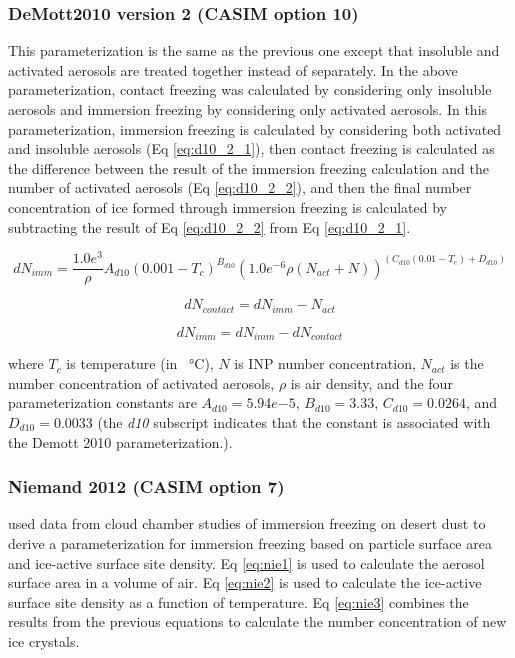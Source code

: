 \subsubsection{DeMott2010 version 2 (CASIM option 10)}
This parameterization is the same as the previous one except that insoluble and activated aerosols are treated together instead of separately. In the above parameterization, contact freezing was calculated by considering only insoluble aerosols and immersion freezing by considering only activated aerosols. In this parameterization, immersion freezing is calculated by considering both activated and insoluble aerosols (Eq \ref{eq:d10_2_1}), then contact freezing is calculated as the difference between the result of the immersion freezing calculation and the number of activated aerosols (Eq \ref{eq:d10_2_2}), and then the final number concentration of ice formed through immersion freezing is calculated by subtracting the result of Eq \ref{eq:d10_2_2} from Eq \ref{eq:d10_2_1}.

\begin{equation} \label{eq:d10_2_1}
dN_{imm} = \frac{1.0e^{3}}{\rho}A_{d10}(0.001 - T_c)^{B_{d10}}(1.0e^{-6}\rho(N_{act}+N))^{(C_{d10}(0.01-T_c)+D_{d10})}
\end{equation}

\begin{equation} \label{eq:d10_2_2}
dN_{contact} = dN_{imm} - N_{act}
\end{equation}

\begin{equation} \label{eq:d10_2_3}
dN_{imm} = dN_{imm} - dN_{contact}
\end{equation}

where $T_c$ is temperature (in \SI{}{\degreeCelsius}), $N$ is INP number concentration, $N_{act}$ is the number concentration of activated aerosols, $\rho$ is air density, and the four parameterization constants are $A_{d10} = 5.94e{-5}$, $B_{d10} = 3.33$, $C_{d10} = 0.0264$, and $D_{d10} = 0.0033$ (the \textit{d10} subscript indicates that the constant is associated with the Demott 2010 parameterization.).


\subsubsection{Niemand 2012 (CASIM option 7)}
\cite{niem2012} used data from cloud chamber studies of immersion freezing on desert dust to derive a parameterization for immersion freezing based on particle surface area and ice-active surface site density. Eq \ref{eq:nie1} is used to calculate the aerosol surface area in a volume of air. Eq \ref{eq:nie2} is used to calculate the ice-active surface site density as a function of temperature. Eq \ref{eq:nie3} combines the results from the previous equations to calculate the number concentration of new ice crystals.

